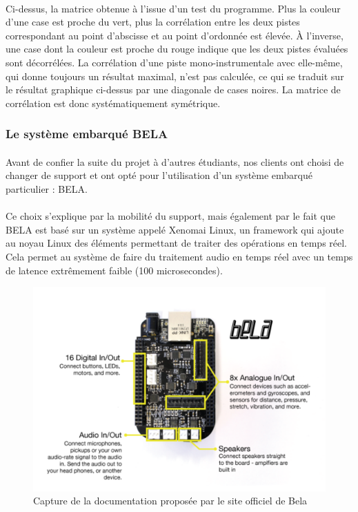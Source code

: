 \paragraph{}
Ci-dessus, la matrice obtenue à l'issue d'un test du programme. Plus
la couleur d'une case est proche du vert, plus la corrélation entre
les deux pistes correspondant au point d'abscisse et au point
d'ordonnée est élevée. À l'inverse, une case dont la couleur est
proche du rouge indique que les deux pistes évaluées sont
décorrélées. La corrélation d'une piste mono-instrumentale avec
elle-même, qui donne toujours un résultat maximal, n'est pas calculée,
ce qui se traduit sur le résultat graphique ci-dessus par une
diagonale de cases noires. La matrice de corrélation est donc
systématiquement symétrique.

\subsubsection{Le système embarqué BELA}
\paragraph{}
Avant de confier la suite du projet à d'autres étudiants, nos clients
ont choisi de changer de support et ont opté pour l'utilisation d'un
système embarqué particulier : BELA.\cite{BELA}

\paragraph{}
Ce choix s'explique par la mobilité du support, mais également par le
fait que BELA est basé sur un système appelé Xenomai Linux, un
framework qui ajoute au noyau Linux des éléments permettant de traiter
des opérations en temps réel.\cite{XENOMAI} Cela permet au système de
faire du traitement audio en temps réel avec un temps de latence
extrêmement faible (100 microsecondes).

\begin{figure}[H]
 \centering
 \includegraphics[scale=0.2]{assets/bela.png}
 \caption{Capture de la documentation proposée par le site officiel de Bela}
 \label{bela}
\end{figure}

